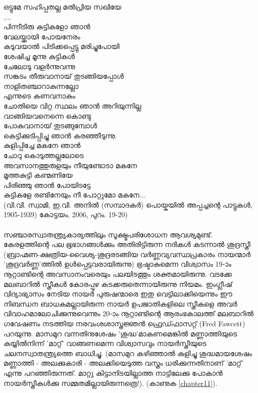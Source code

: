 \begin{tcolorbox}[%
 breakable, %
  arc=0mm, 
  left=1pt, right = 1pt, 
  boxrule=0mm,
  colback = {blue!10}, %
]
ഒട്ടുമേ സഹിപ്പതല്ല മൽപ്രിയ സഖിയേ\\
....\\
പിന്നീടിരു കുട്ടികളോ ഞാൻ\\
വേലയ്ക്കായി പോയനേരം\\
കടുവയാൽ പിടിക്കപ്പെട്ടു മരിച്ചുപോയി\\
ശേഷിച്ച മൂന്നു കുട്ടികൾ\\
ചേലോടു വളർന്നുവന്നു\\
സങ്കടം തീരുവാനായ് തുടങ്ങിയപ്പോൾ\\
നാളിതഞ്ചാറാകുന്നല്ലോ\\
എന്നുടെ കണവനാകും\\
ചോതിയെ വിറ്റ സ്ഥലം ഞാൻ അറിയുന്നില്ല\\
വാങ്ങിയവനെന്നെ കൊണ്ടു\\
പോകുവാനായ് തുടങ്ങുമ്പോൾ\\
കെട്ടിക്കുടിപ്പിച്ചു ഞാൻ കരഞ്ഞീടുന്നു.\\
കുളിപ്പിച്ചേ മകനേ ഞാൻ\\
ചോറു കൊടുത്തല്ലലോടെ\\
അവസാനത്തുരുളയും നീയുണ്ടോടാ മകനേ\\
മൂത്തകുട്ടി കണ്മണിയേ\\
പിരിഞ്ഞു ഞാൻ പോയിടട്ടേ\\
കുട്ടികളേ രണ്ടിനേയും നീ പോറ്റുമോ മകനേ...\\
(വി.വി. സ്വാമി, ഇ.വി. അനിൽ (സമ്പാദകർ) പൊയ്കയിൽ അപ്പച്ചന്റെ പാട്ടുകൾ, 1905-1939) കോട്ടയം, 2006, പുറം. 19-20)

\end{tcolorbox}

\paragraph{}സഞ്ചാരസ്വാതന്ത്ര്യകാര്യത്തിലും സൂക്ഷ്മപരിശോധന ആവശ്യമുണ്ട്. കേരളത്തിന്റെ പല ഭൂഭാഗങ്ങൾക്കും അതിരിട്ടിരുന്ന നദികൾ കടന്നാൽ ശൂദ്രസ്ത്രീ (ബ്രാഹ്മണ-ക്ഷത്രിയ-വൈശ്യ-ശൂദ്രരടങ്ങിയ വർണ്ണവ്യവസ്ഥപ്രകാരം നായന്മാർ 'ശൂദ്രവർണ്ണ'ത്തിൽ ഉൾപ്പെട്ടവരായിരുന്നു) ഭ്രഷ്ടാകുമെന്ന വിശ്വാസം 19-ാം നൂറ്റാണ്ടിന്റെ അവസാനംവരെയും പലയിടത്തും ശക്തമായിരുന്നു. വടക്കേ മലബാറിൽ സ്ത്രീകൾ കോരപ്പുഴ കടക്കരുതെന്നായിരുന്നു നിയമം. ഇംഗ്ലീഷ് വിദ്യാഭ്യാസം നേടിയ നായർ പുരുഷന്മാരെ ഇതു വെട്ടിലാക്കിയെന്നും ഈ നിബന്ധന ബാധകമല്ലായിരുന്ന നായർ ഉപജാതികളിലെ സ്ത്രീകളെ അവർ വിവാഹമാലോചിക്കുന്നുവെന്നും 20-ാം നൂറ്റാണ്ടിന്റെ ആരംഭകാലത്ത് മലബാറിൽ ഗവേഷണം നടത്തിയ നരവംശശാസ്ത്രജ്ഞൻ ഫ്രെഡ്ഫാസറ്റ് (Fred Fawcett) പറയുന്നു. മാസമുറ വന്നതിനുശേഷം 'ശുദ്ധ'മാകണമെങ്കിൽ മണ്ണാത്തിയുടെ കയ്യിൽനിന്ന് 'മാറ്റ്' വാങ്ങണമെന്ന വിശ്വാസവും നായർസ്ത്രീയുടെ ചലനസ്വാതന്ത്ര്യത്തെ ബാധിച്ചു. (മാസമുറ കഴിഞ്ഞാൽ കുളിച്ചു ശുദ്ധമായശേഷം മണ്ണാത്തി - അലക്കുകാരി - അലക്കിയെടുത്ത വസ്ത്രം ധരിക്കുന്നതിനാണ് 'മാറ്റ്' എന്നു പറഞ്ഞിരുന്നത്. മാറ്റു കിട്ടാനിടയില്ലാത്ത നാട്ടിലേക്കു പോകാൻ നായർസ്ത്രീകൾക്കു സമ്മതമില്ലായിരുന്നത്രെ!). (കാണുക \ref{chapter11}).

